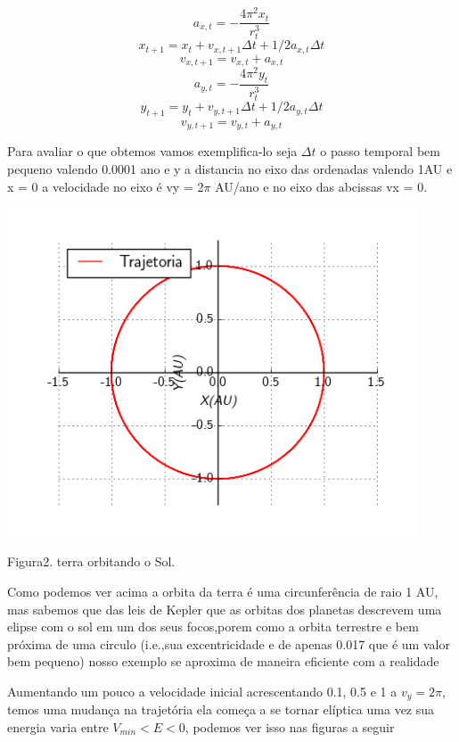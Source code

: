 \documentclass[a4paper]{article} %
\begin{document}
\[a_{x,t} = -\frac{4\pi^2x_t}{r_t^3}\]
\[x_{t+1} = x_t +v_{x,t+1}\Delta{t} + 1/2a_{x,t}\Delta{t} \]
\[v_{x,t+1} = v_{x,t} + a_{x,t}\] 
\[a_{y,t} = -\frac{4\pi^2y_t}{r_t^3}\]
\[y_{t+1} = y_t +v_{y,t+1}\Delta{t} + 1/2a_{y,t}\Delta{t} \]
\[v_{y,t+1} = v_{y,t} + a_{y,t}\] 

Para avaliar o que obtemos vamos exemplifica-lo seja $\Delta{t}$ o passo temporal bem pequeno valendo 0.0001 ano e y a distancia no eixo das ordenadas valendo 1AU e x = 0 a velocidade no eixo é vy = 2$\pi$ AU/ano e no eixo das abcissas vx = 0.

\begin{center}
	\includegraphics[width=4.80in,height=3.84in, keepaspectratio=false]{image1_15-50-59-772000.png}
	
	\scriptsize{Figura2. terra orbitando o Sol.}
\end{center}

Como podemos ver acima a orbita da terra \'{e} uma circunfer\^{e}ncia de raio 1 AU, mas sabemos que das leis de Kepler que as orbitas dos planetas descrevem uma elipse com o sol em um dos seus focos,porem como a orbita terrestre e bem pr\'{o}xima de uma circulo (i.e.,sua excentricidade e de apenas 0.017 que \'{e} um valor bem pequeno) nosso exemplo se aproxima de maneira eficiente com a realidade

Aumentando um pouco a velocidade inicial acrescentando 0.1, 0.5 e 1 a $v_y = 2\pi$, temos uma mudança na trajetória ela começa a se tornar elíptica uma vez sua energia varia entre $V_{min} < E < 0$, podemos ver isso nas figuras a seguir 

\vspace{1.1cm}
\end{document}
